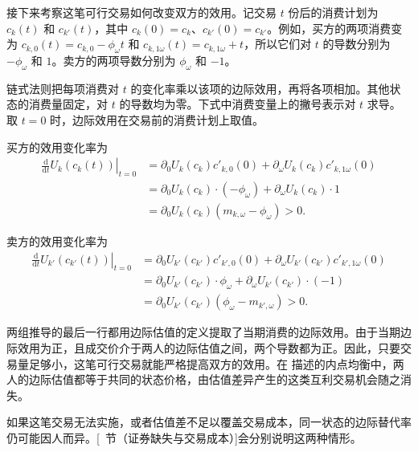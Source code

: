 接下来考察这笔可行交易如何改变双方的效用。记交易 $t$ 份后的消费计划为 $c_k(t)$ 和 $c_{k'}(t)$，其中 $c_k(0)=c_k$、$c_{k'}(0)=c_{k'}$。例如，买方的两项消费变为 $c_{k,0}(t)=c_{k,0}-\phi_\omega t$ 和 $c_{k,1\omega}(t)=c_{k,1\omega}+t$，所以它们对 $t$ 的导数分别为 $-\phi_\omega$ 和 $1$。卖方的两项导数分别为 $\phi_\omega$ 和 $-1$。

链式法则把每项消费对 $t$ 的变化率乘以该项的边际效用，再将各项相加。其他状态的消费量固定，对 $t$ 的导数均为零。下式中消费变量上的撇号表示对 $t$ 求导。取 $t=0$ 时，边际效用在交易前的消费计划上取值。

买方的效用变化率为
\[
 \begin{aligned}
 \left.\frac{\mathrm d}{\mathrm dt}U_k(c_k(t))\right|_{t=0}
 &=\partial_0U_k(c_k)c'_{k,0}(0)+\partial_\omega U_k(c_k)c'_{k,1\omega}(0)\\
 &=\partial_0U_k(c_k)\cdot(-\phi_\omega)+\partial_\omega U_k(c_k)\cdot1\\
 &=\partial_0U_k(c_k)(m_{k,\omega}-\phi_\omega)>0.
 \end{aligned}
\]

卖方的效用变化率为
\[
 \begin{aligned}
 \left.\frac{\mathrm d}{\mathrm dt}U_{k'}(c_{k'}(t))\right|_{t=0}
 &=\partial_0U_{k'}(c_{k'})c'_{k',0}(0)+\partial_\omega U_{k'}(c_{k'})c'_{k',1\omega}(0)\\
 &=\partial_0U_{k'}(c_{k'})\cdot\phi_\omega+\partial_\omega U_{k'}(c_{k'})\cdot(-1)\\
 &=\partial_0U_{k'}(c_{k'})(\phi_\omega-m_{k',\omega})>0.
 \end{aligned}
\]

两组推导的最后一行都用边际估值的定义提取了当期消费的边际效用。由于当期边际效用为正，且成交价介于两人的边际估值之间，两个导数都为正。因此，只要交易量足够小，这笔可行交易就能严格提高双方的效用。在 描述的内点均衡中，两人的边际估值都等于共同的状态价格，由估值差异产生的这类互利交易机会随之消失。

如果这笔交易无法实施，或者估值差不足以覆盖交易成本，同一状态的边际替代率仍可能因人而异。[~节（证券缺失与交易成本）]会分别说明这两种情形。

